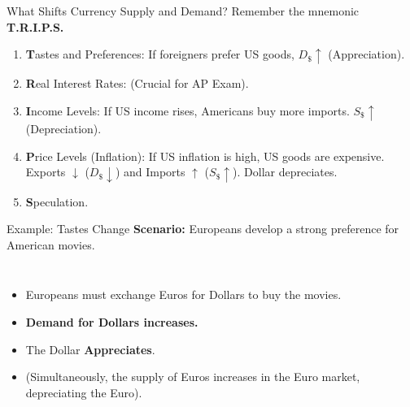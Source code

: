 \documentclass[aspectratio=169]{beamer}
\begin{document}
\begin{frame}{What Shifts Currency Supply and Demand?}
    Remember the mnemonic \textbf{T.R.I.P.S.}
    \vspace{0.5cm}
    \begin{enumerate}
        \item \textbf{T}astes and Preferences: If foreigners prefer US goods, $D_{\$} \uparrow$ (Appreciation).
        \item \textbf{R}eal Interest Rates: (Crucial for AP Exam).
        \item \textbf{I}ncome Levels: If US income rises, Americans buy more imports. $S_{\$} \uparrow$ (Depreciation).
        \item \textbf{P}rice Levels (Inflation): If US inflation is high, US goods are expensive. Exports $\downarrow$ ($D_{\$} \downarrow$) and Imports $\uparrow$ ($S_{\$} \uparrow$). Dollar depreciates.
        \item \textbf{S}peculation.
    \end{enumerate}
\end{frame}

\begin{frame}{Example: Tastes Change}
    \textbf{Scenario:} Europeans develop a strong preference for American movies.
    \begin{columns}
        \begin{itemize}
            \item Europeans must exchange Euros for Dollars to buy the movies.
            \item \textbf{Demand for Dollars increases.}
            \item The Dollar \textbf{Appreciates}.
            \item (Simultaneously, the supply of Euros increases in the Euro market, depreciating the Euro).
        \end{itemize}
        
    \end{columns}
\end{frame}
\end{document}
